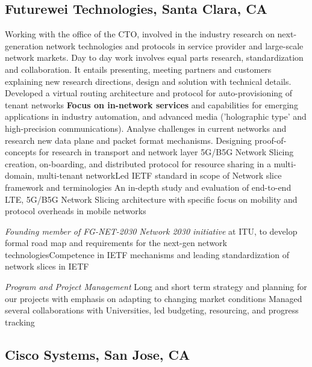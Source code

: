 \documentclass[11pt,a4paper,sans]{moderncv} %
\begin{document}
\subsection{Futurewei Technologies, Santa Clara, CA}
{Working with the office of the CTO, involved in the industry research on next-generation network technologies and protocols in service provider and large-scale network markets. Day to day work involves equal parts research, standardization and collaboration. It entails presenting, meeting partners and customers explaining new research directions, design and solution with technical details.\\
}
{Developed a virtual routing architecture and protocol for auto-provisioning of tenant networks}{}
{\textbf{Focus on in-network services} and capabilities for emerging applications in industry automation, and advanced media ('holographic type' and high-precision communications). Analyse challenges in current networks and research new data plane and packet format mechanisms. Designing proof-of-concepts for research in transport and network layer}{}
{5G/B5G Network Slicing creation, on-boarding, and  distributed protocol for resource sharing in a multi-domain, multi-tenant network}{Led IETF standard in scope of Network slice framework and terminologies} {}
{An in-depth study and evaluation of end-to-end LTE, 5G/B5G Network Slicing architecture with specific focus on mobility and protocol overheads in mobile networks} {}

 {\textit{Founding member of FG-NET-2030}}{}{}
 {\emph{Network 2030 initiative} at ITU, to develop formal road map and requirements for the next-gen network technologies}{Competence in IETF mechanisms and leading standardization of network slices in IETF}

 {\textit{Program and Project Management}}{}{}
{Long and short term strategy and planning for our projects with emphasis on adapting to  changing market conditions}
{Managed several collaborations with Universities, led budgeting, resourcing, and progress tracking}
\subsection{Cisco Systems, San Jose, CA}
\end{document}

